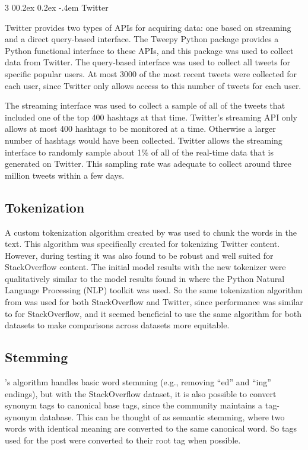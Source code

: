 \documentclass[man,donotrepeattitle]{apa6}
\makeatletter
\renewcommand{\subsubsection}{%
  \@startsection
  {subsubsection}%
  {3}%
  {\parindent}%
  {0\baselineskip \@plus 0.2ex \@minus 0.2ex}%
  {-.4em}%
  {\normalfont\normalsize\bfseries\addperi}}
\makeatother
\begin{document}
\subsubsection{Twitter}

Twitter provides two types of APIs for acquiring data: one based on streaming and a direct query-based interface.
The Tweepy Python package provides a Python functional interface to these APIs, and this package was used to collect data from Twitter.
The query-based interface was used to collect all tweets for specific popular users.
At most \num{3000} of the most recent tweets were collected for each user, since Twitter only allows access to this number of tweets for each user.

The streaming interface was used to collect a sample of all of the tweets that included one of the top 400 hashtags at that time.
Twitter's streaming API only allows at most 400 hashtags to be monitored at a time.
Otherwise a larger number of hashtags would have been collected.
Twitter allows the streaming interface to randomly sample about 1\% of all of the real-time data that is generated on Twitter.
This sampling rate was adequate to collect around three million tweets within a few days.

\subsection{Tokenization}

A custom tokenization algorithm created by \textcite{Owoputi2013} was used to chunk the words in the text.
This algorithm was specifically created for tokenizing Twitter content.
However, during testing it was also found to be robust and well suited for StackOverflow content.
The initial model results with the new tokenizer were qualitatively similar to the model results found in \textcite{Stanley2013} where the Python Natural Language Processing (NLP) toolkit \parencite{Bird2009} was used.
So the same tokenization algorithm from \textcite{Owoputi2013} was used for both StackOverflow and Twitter, since performance was similar to \textcite{Stanley2013} for StackOverflow,
and it seemed beneficial to use the same algorithm for both datasets to make comparisons across datasets more equitable.

\subsection{Stemming}

\textcite{Owoputi2013}'s algorithm handles basic word stemming (e.g., removing ``ed'' and ``ing'' endings), but
with the StackOverflow dataset, it is also possible to convert synonym tags to canonical base tags, since the community maintains a tag-synonym database.
This can be thought of as semantic stemming, where two words with identical meaning are converted to the same canonical word.
So tags used for the post were converted to their root tag when possible.
\end{document}
